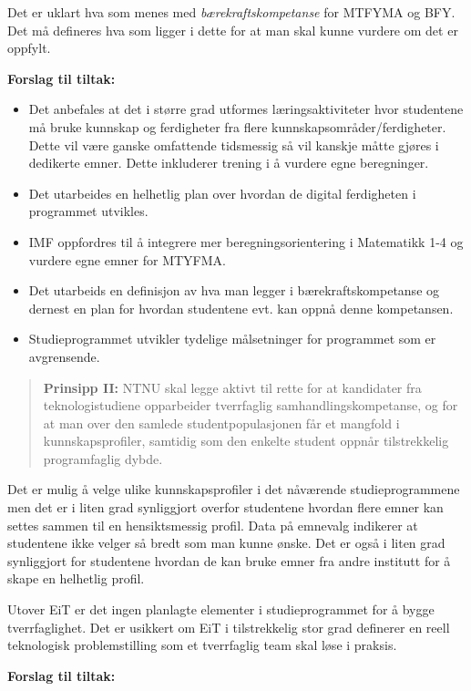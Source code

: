 Det er uklart hva som menes med \emph{bærekraftskompetanse} for MTFYMA og BFY. Det må defineres hva som ligger i dette for at man skal kunne vurdere om det er oppfylt.

\textbf{Forslag til tiltak:}
\begin{itemize}
	\item Det anbefales at det i større grad utformes læringsaktiviteter hvor studentene må bruke kunnskap og ferdigheter fra flere kunnskapsområder/ferdigheter. Dette vil være ganske omfattende tidsmessig så vil kanskje måtte gjøres i dedikerte emner. Dette inkluderer trening i å vurdere egne beregninger.
	\item Det utarbeides en helhetlig plan over hvordan de digital ferdigheten i programmet utvikles. 
	\item IMF oppfordres til å integrere mer beregningsorientering i Matematikk 1-4 og vurdere egne emner for MTYFMA.
	\item Det utarbeids en definisjon av hva man legger i bærekraftskompetanse og dernest en plan for hvordan studentene evt. kan oppnå denne kompetansen.
	\item Studieprogrammet utvikler tydelige målsetninger for programmet som er avgrensende.
\end{itemize}

\begin{quote}
	\textbf{Prinsipp II:} NTNU skal legge aktivt til rette for at kandidater fra teknologistudiene opparbeider tverrfaglig samhandlingskompetanse, og for at man over den samlede studentpopulasjonen får et mangfold i kunnskapsprofiler, samtidig som den enkelte student oppnår tilstrekkelig programfaglig dybde.
\end{quote}

Det er mulig å velge ulike kunnskapsprofiler i det nåværende studieprogrammene men det er i liten grad synliggjort overfor studentene hvordan flere emner kan settes sammen til en hensiktsmessig profil. Data på emnevalg indikerer at studentene ikke velger så bredt som man kunne ønske. Det er også i liten grad synliggjort for studentene hvordan de kan bruke emner fra andre institutt for å skape en helhetlig profil.

Utover EiT er det ingen planlagte elementer i studieprogrammet for å bygge tverrfaglighet. Det er usikkert om EiT i tilstrekkelig stor grad definerer en reell teknologisk problemstilling som et tverrfaglig team skal løse i praksis. 

\textbf{Forslag til tiltak:}

